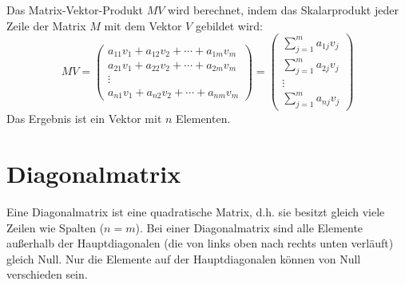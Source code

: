 Das Matrix-Vektor-Produkt $MV$ wird berechnet, indem das Skalarprodukt jeder Zeile der Matrix $M$ mit dem Vektor $V$ gebildet wird:
\[
   MV = \begin{pmatrix}
   a_{11}v_1 + a_{12}v_2 + \cdots + a_{1m}v_m \\
   a_{21}v_1 + a_{22}v_2 + \cdots + a_{2m}v_m \\
   \vdots \\
   a_{n1}v_1 + a_{n2}v_2 + \cdots + a_{nm}v_m
   \end{pmatrix} = \begin{pmatrix} \sum_{j=1}^{m} a_{1j}v_j \\ \sum_{j=1}^{m} a_{2j}v_j \\ \vdots \\ \sum_{j=1}^{m} a_{nj}v_j \end{pmatrix}
\]
Das Ergebnis ist ein Vektor mit $n$ Elementen.

\section{Diagonalmatrix}

Eine Diagonalmatrix ist eine quadratische Matrix, d.h. sie besitzt gleich viele Zeilen wie Spalten ($n=m$). Bei einer Diagonalmatrix sind alle Elemente außerhalb der Hauptdiagonalen (die von links oben nach rechts unten verläuft) gleich Null. Nur die Elemente auf der Hauptdiagonalen können von Null verschieden sein.


